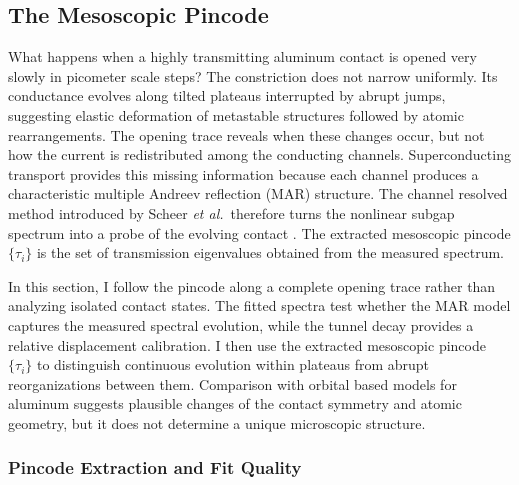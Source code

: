 
    \subsection{The Mesoscopic Pincode}
    \label{subsec:ac:pincode}

    What happens when a highly transmitting aluminum contact is opened very slowly in picometer scale steps? The constriction does not narrow uniformly. Its conductance evolves along tilted plateaus interrupted by abrupt jumps, suggesting elastic deformation of metastable structures followed by atomic rearrangements. The opening trace reveals when these changes occur, but not how the current is redistributed among the conducting channels. Superconducting transport provides this missing information because each channel produces a characteristic multiple Andreev reflection (MAR) structure. The channel resolved method introduced by Scheer \textit{et al.}~therefore turns the nonlinear subgap spectrum into a probe of the evolving contact \cite{scheer_conduction_1997}. The extracted mesoscopic pincode \(\{\tau_i\}\) is the set of transmission eigenvalues obtained from the measured spectrum.

    In this section, I follow the pincode along a complete opening trace rather than analyzing isolated contact states. The fitted spectra test whether the MAR model captures the measured spectral evolution, while the tunnel decay provides a relative displacement calibration. I then use the extracted mesoscopic pincode \(\{\tau_i\}\) to distinguish continuous evolution within plateaus from abrupt reorganizations between them. Comparison with orbital based models for aluminum suggests plausible changes of the contact symmetry and atomic geometry, but it does not determine a unique microscopic structure.

    \subsubsection*{Pincode Extraction and Fit Quality}

